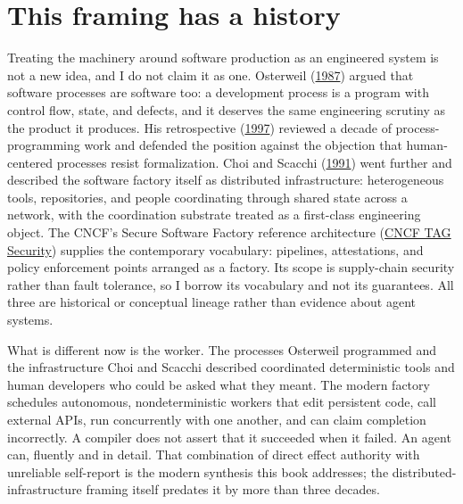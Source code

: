 \hypertarget{this-framing-has-a-history}{%
\section*{This framing has a history}\label{this-framing-has-a-history}}

Treating the machinery around software production as an engineered system is not a new idea, and I do not claim it as one. Osterweil (\href{https://dl.acm.org/doi/10.5555/41765.41766}{1987}) argued that software processes are software too: a development process is a program with control flow, state, and defects, and it deserves the same engineering scrutiny as the product it produces. His retrospective (\href{https://dl.acm.org/doi/10.1145/253228.253440}{1997}) reviewed a decade of process-programming work and defended the position against the objection that human-centered processes resist formalization. Choi and Scacchi (\href{https://www.ics.uci.edu/~wscacchi/Software-Process/Readings/DistSysFactory.pdf}{1991}) went further and described the software factory itself as distributed infrastructure: heterogeneous tools, repositories, and people coordinating through shared state across a network, with the coordination substrate treated as a first-class engineering object. The CNCF's Secure Software Factory reference architecture (\href{https://tag-security.cncf.io/community/working-groups/supply-chain-security/secure-software-factory/secure-software-factory/}{CNCF TAG Security}) supplies the contemporary vocabulary: pipelines, attestations, and policy enforcement points arranged as a factory. Its scope is supply-chain security rather than fault tolerance, so I borrow its vocabulary and not its guarantees. All three are historical or conceptual lineage rather than evidence about agent systems.

What is different now is the worker. The processes Osterweil programmed and the infrastructure Choi and Scacchi described coordinated deterministic tools and human developers who could be asked what they meant. The modern factory schedules autonomous, nondeterministic workers that edit persistent code, call external APIs, run concurrently with one another, and can claim completion incorrectly. A compiler does not assert that it succeeded when it failed. An agent can, fluently and in detail. That combination of direct effect authority with unreliable self-report is the modern synthesis this book addresses; the distributed-infrastructure framing itself predates it by more than three decades.


